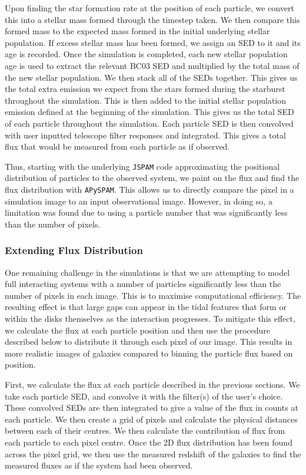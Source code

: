 Upon finding the star formation rate at the position of each particle, we convert this into a stellar mass formed through the timestep taken. We then compare this formed mass to the expected mass formed in the initial underlying stellar population. If excess stellar mass has been formed, we assign an SED to it and its age is recorded. Once the simulation is completed, each new stellar population age is used to extract the relevant BC03 SED and multiplied by the total mass of the new stellar population. We then stack all of the SEDs together. This gives us the total extra emission we expect from the stars formed during the starburst throughout the simulation. This is then added to the initial stellar population emission defined at the beginning of the simulation. This gives us the total SED of each particle throughout the simulation. Each particle SED is then convolved with user inputted telescope filter responses and integrated. This gives a total flux that would be measured from each particle as if observed. 

Thus, starting with the underlying \texttt{JSPAM} code approximating the positional distribution of particles to the observed system, we paint on the flux and find the flux distribution with \texttt{APySPAM}. This allows us to directly compare the pixel in a simulation image to an input observational image. However, in doing so, a limitation was found due to using a particle number that was significantly less than the number of pixels.

\subsubsection{Extending Flux Distribution}\label{flux_dist}
\noindent One remaining challenge in the simulations is that we are attempting to model full interacting systems with a number of particles significantly less than the number of pixels in each image. This is to maximise computational efficiency. The resulting effect is that large gaps can appear in the tidal features that form or within the disks themselves as the interaction progresses. To mitigate this effect, we calculate the flux at each particle position and then use the procedure described below to distribute it through each pixel of our image. This results in more realistic images of galaxies compared to binning the particle flux based on position.

First, we calculate the flux at each particle described in the previous sections. We take each particle SED, and convolve it with the filter(s) of the user's choice. These convolved SEDs are then integrated to give a value of the flux in counts at each particle. We then create a grid of pixels and calculate the physical distances between each of their centres. We then calculate the contribution of flux from each particle to each pixel centre. Once the 2D flux distribution has been found across the pixel grid, we then use the measured redshift of the galaxies to find the measured fluxes as if the system had been observed.

